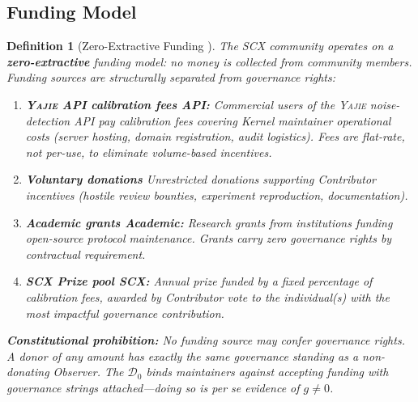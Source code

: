 \documentclass[12pt,a4paper]{article}
\newtheorem{definition}[theorem]{Definition}
\theoremstyle{definition}
\newcommand{\Yajie}{\textsc{Yajie}}
\newcommand{\gnonzero}{g \neq 0}
\newcommand{\GzeroDecl}{\mathcal{D}_{0}}
\begin{document}
\subsection{Funding Model}
\begin{definition}[Zero-Extractive Funding ]
\label{def:funding}
The SCX community operates on a \textbf{zero-extractive} funding model: no money is collected from community members. Funding sources are structurally separated from governance rights:
\begin{enumerate}[label=(\roman*)]
    \item \textbf{\Yajie{} API calibration fees API:} Commercial users of the \Yajie{} noise-detection API pay calibration fees covering Kernel maintainer operational costs (server hosting, domain registration, audit logistics). Fees are flat-rate, not per-use, to eliminate volume-based incentives.
    \item \textbf{Voluntary donations} Unrestricted donations supporting Contributor incentives (hostile review bounties, experiment reproduction, documentation).
    \item \textbf{Academic grants Academic:} Research grants from institutions funding open-source protocol maintenance. Grants carry zero governance rights by contractual requirement.
    \item \textbf{SCX Prize pool SCX:} Annual prize funded by a fixed percentage of calibration fees, awarded by Contributor vote to the individual(s) with the most impactful governance contribution.
\end{enumerate}
\textbf{Constitutional prohibition:} No funding source may confer governance rights. A donor of any amount has exactly the same governance standing as a non-donating Observer. The $\GzeroDecl$ binds maintainers against accepting funding with governance strings attached---doing so is per se evidence of $\gnonzero$.
\end{definition}
\end{document}
